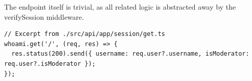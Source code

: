 \documentclass{report}
\begin{document}
The endpoint itself is trivial, as all related logic is abstracted away by the verifySession middleware.
\begin{verbatim}
// Excerpt from ./src/api/app/session/get.ts
whoami.get('/', (req, res) => {
  res.status(200).send({ username: req.user?.username, isModerator: req.user?.isModerator });
});
\end{verbatim}

\printbibliography
\end{document}
